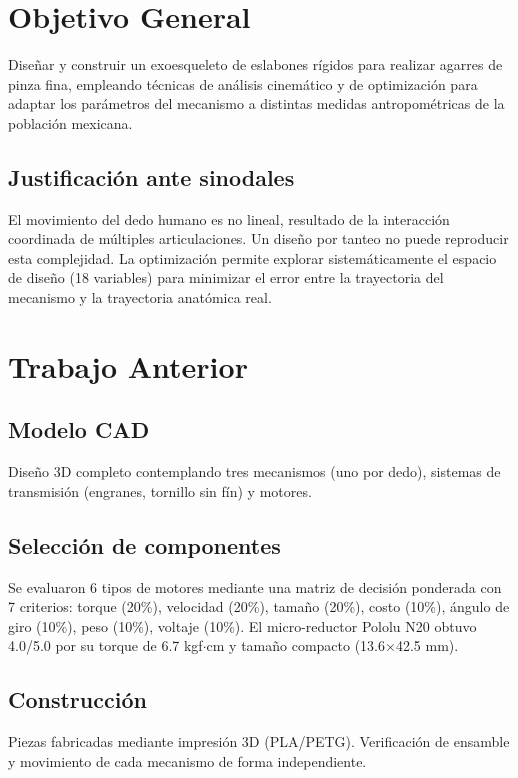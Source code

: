 \documentclass[11pt,letterpaper]{article}
\begin{document}
\section{Objetivo General}

Dise\~nar y construir un exoesqueleto de eslabones r\'igidos para realizar agarres de pinza fina, empleando t\'ecnicas de an\'alisis cinem\'atico y de optimizaci\'on para adaptar los par\'ametros del mecanismo a distintas medidas antropom\'etricas de la poblaci\'on mexicana.

\subsection{Justificaci\'on ante sinodales}
El movimiento del dedo humano es no lineal, resultado de la interacci\'on coordinada de m\'ultiples articulaciones. Un dise\~no por tanteo no puede reproducir esta complejidad. La optimizaci\'on permite explorar sistem\'aticamente el espacio de dise\~no (18 variables) para minimizar el error entre la trayectoria del mecanismo y la trayectoria anat\'omica real.

\section{Trabajo Anterior}

\subsection{Modelo CAD}
Dise\~no 3D completo contemplando tres mecanismos (uno por dedo), sistemas de transmisi\'on (engranes, tornillo sin f\'in) y motores.

\subsection{Selecci\'on de componentes}
Se evaluaron 6 tipos de motores mediante una matriz de decisi\'on ponderada con 7 criterios: torque (20\%), velocidad (20\%), tama\~no (20\%), costo (10\%), \'angulo de giro (10\%), peso (10\%), voltaje (10\%). El micro-reductor Pololu N20 obtuvo 4.0/5.0 por su torque de 6.7 kgf$\cdot$cm y tama\~no compacto (13.6$\times$42.5 mm).

\subsection{Construcci\'on}
Piezas fabricadas mediante impresi\'on 3D (PLA/PETG). Verificaci\'on de ensamble y movimiento de cada mecanismo de forma independiente.
\end{document}
